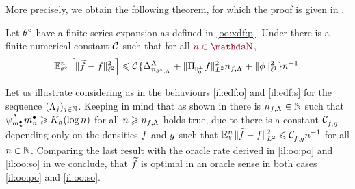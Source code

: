 More precisely, we obtain the following theorem, for which the proof is given in .
\begin{thm}\label{THM_FREQ_CIRCDECONV_KNOWN_IID_ORACLE_P}
Let $\fxdf$ have a finite series expansion as defined in \ref{oo:xdf:p}.
Under  there is a finite numerical constant $\cst{}$ such that for all $\dr\ssY\in\N$,
\begin{equation}\label{re:ub:p:e1}
\FuEx[\ssY]{\fxdf}\left[\Vnormlp{\txdf-\xdf}^2\right]
\leq\cst{}\{\DipenSv[{\ssY_{\fxdf,\iSv}}]+\VnormLp{\Proj[{\mHiH[0]^\perp}]\xdf}^2\ssY_{\xdf,\iSv}+ \Vnormlp[1]{\fydf}^2\}\ssY^{-1}.
\end{equation}
\end{thm}
\begin{il}\label{il:ub:p}
Let us illustrate 
  considering as in  the behaviours
  \ref{il:edf:o} and \ref{il:edf:s} for the sequence
  $\Nsuite[j]{\iSv[j]}$.  Keeping in mind that as shown in  there is ${\ssY}_{\xdf,\iSv}\in\Nz$ such that
    $\cmiSv[\sDi{\ssY}]\sDi{\ssY}\geq K_{\ydf}(\log\ssY)$  for all $\ssY\geq{\ssY}_{\xdf,\iSv}$ 
 holds true, due to  there is a constant $\cst{\xdf,\edf}$
 depending only on the densities $\xdf$ and $\edf$ such that 
 $\FuEx[\ssY]{\rY}\VnormLp{\txdf-\xdf}^2\leq
 \cst{\xdf,\edf}\ssY^{-1}$ for all $\ssY\in\Nz$. Comparing the last result
 with the oracle rate derived in \ref{il:oo:po} and  \ref{il:oo:so}
 in  we conclude, that $\txdf$ is optimal  in an oracle sense in both cases \ref{il:oo:po} and  \ref{il:oo:so}.
\end{il}

\medskip

